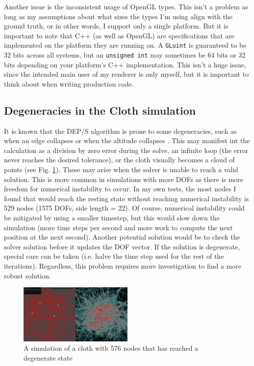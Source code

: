 \documentclass[letterpaper, 10 pt, conference]{ieeeconf}  %
\begin{document}
Another issue is the inconsistent usage of OpenGL types. This isn't a problem as long as my assumptions about what sizes the types I'm using align with the ground truth, or in other words, I support only a single platform. But it is important to note that C++ (as well as OpenGL) are specifications that are implemented on the platform they are running on. A \texttt{GLuint} is guaranteed to be 32 bits across all systems, but an \texttt{unsigned int} may sometimes be 64 bits or 32 bits depending on your platform's C++ implementation. This isn't a huge issue, since the intended main user of my renderer is only myself, but it is important to think about when writing production code.

\subsection{Degeneracies in the Cloth simulation}
It is known that the DEP/S algorithm is prone to some degeneracies, such as when an edge collapses or when the altitude collapses \cite{Tamstorf2013discrete}. This may manifest int the calculation as a division by zero error during the solve, an infinite loop (the error never reaches the desired tolerance), or the cloth visually becomes a cloud of points (see Fig. \ref{fig:chaos}). These may arise when the solver is unable to reach a valid solution. This is more common in simulations with more DOFs as there is more freedom for numerical instability to occur. In my own tests, the most nodes I found that would reach the resting state without reaching numerical instability is 529 nodes (1575 DOFs, side length = 22). Of course, numerical instability could be mitigated by using a smaller timestep, but this would slow down the simulation (more time steps per second and more work to compute the next position at the next second). Another potential solution would be to check the solver solution before it updates the DOF vector. If the solution is degenerate, special care can be taken (i.e. halve the time step used for the rest of the iterations). Regardless, this problem requires more investigation to find a more robust solution.



\begin{figure}
        \centering
        \includegraphics[width=0.5\textwidth]{chaos1.png}
        \caption{A simulation of a cloth with 576 nodes that has reached a degenerate state} \label{fig:chaos}
\end{figure}
\end{document}
